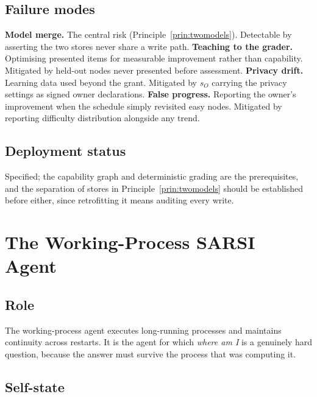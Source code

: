 \documentclass[11pt]{article}
\begin{document}
\subsection{Failure modes}

\textbf{Model merge.} The central risk (Principle~\ref{prin:twomodels}). Detectable by asserting the two stores never share a write path.
\textbf{Teaching to the grader.} Optimising presented items for measurable improvement rather than capability. Mitigated by held-out nodes never presented before assessment.
\textbf{Privacy drift.} Learning data used beyond the grant. Mitigated by $s_O$ carrying the privacy settings as signed owner declarations.
\textbf{False progress.} Reporting the owner's improvement when the schedule simply revisited easy nodes. Mitigated by reporting difficulty distribution alongside any trend.

\subsection{Deployment status}

Specified; the capability graph and deterministic grading are the prerequisites, and the separation of stores in Principle~\ref{prin:twomodels} should be established before either, since retrofitting it means auditing every write.

\section{The Working-Process SARSI Agent}
\label{sec:process}

\subsection{Role}

The working-process agent executes long-running processes and maintains continuity across restarts. It is the agent for which \emph{where am I} is a genuinely hard question, because the answer must survive the process that was computing it.

\subsection{Self-state}
\end{document}
